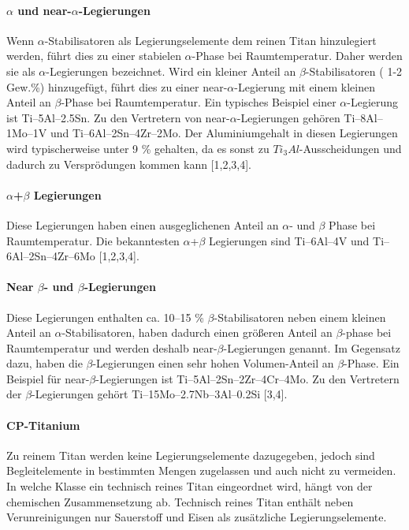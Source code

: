 \paragraph{$\alpha$ und near-$\alpha$-Legierungen}
Wenn $\alpha$-Stabilisatoren als Legierungselemente dem reinen Titan hinzulegiert werden, führt dies zu einer stabielen $\alpha$-Phase bei Raumtemperatur. Daher werden sie als $\alpha$-Legierungen bezeichnet. Wird ein kleiner Anteil an $\beta$-Stabilisatoren ( 1-2 Gew.\%) hinzugefügt, führt dies zu einer near-$\alpha$-Legierung mit einem kleinen Anteil an $\beta$-Phase bei Raumtemperatur. Ein typisches Beispiel einer $\alpha$-Legierung ist Ti–5Al–2.5Sn. Zu den Vertretern von near-$\alpha$-Legierungen gehören Ti–8Al–1Mo–1V und Ti–6Al–2Sn–4Zr–2Mo. Der Aluminiumgehalt in diesen Legierungen wird typischerweise unter 9 \% gehalten, da es sonst zu $Ti_{3}Al$-Ausscheidungen und dadurch zu Versprödungen kommen kann [1,2,3,4].

\paragraph{$\alpha$+$\beta$ Legierungen}
Diese Legierungen haben einen ausgeglichenen Anteil an $\alpha$- und $\beta$ Phase bei Raumtemperatur. Die bekanntesten $\alpha$+$\beta$ Legierungen sind Ti–6Al–4V und Ti–6Al–2Sn–4Zr–6Mo [1,2,3,4].

\paragraph{Near $\beta$- und $\beta$-Legierungen}
Diese Legierungen enthalten ca. 10--15 \% $\beta$-Stabilisatoren neben einem kleinen Anteil an $\alpha$-Stabilisatoren, haben dadurch einen größeren Anteil an $\beta$-phase bei Raumtemperatur und werden deshalb near-$\beta$-Legierungen genannt. Im Gegensatz dazu, haben die $\beta$-Legierungen einen sehr hohen Volumen-Anteil an $\beta$-Phase. Ein Beispiel für near-$\beta$-Legierungen ist Ti–5Al–2Sn–2Zr–4Cr–4Mo. Zu den Vertretern der $\beta$-Legierungen gehört Ti–15Mo–2.7Nb–3Al–0.2Si [3,4].

\paragraph{CP-Titanium} 
Zu reinem Titan werden keine Legierungselemente dazugegeben, jedoch sind Begleitelemente in bestimmten Mengen zugelassen und auch nicht zu vermeiden. In welche Klasse ein technisch reines Titan eingeordnet wird, hängt von der chemischen Zusammensetzung ab. Technisch reines Titan enthält neben Verunreinigungen nur Sauerstoff und Eisen als zusätzliche Legierungselemente.


